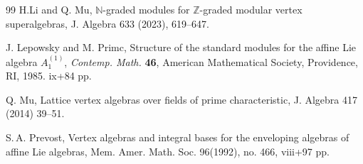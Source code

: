 \documentclass[12pt]{article}
\def\ZZ{{\mathbb Z}}
\begin{document}
\begin{thebibliography}{99}
 H.Li and Q. Mu, $\mathbb{N}$-graded modules for $\ZZ$-graded modular vertex
superalgebras, J. Algebra 633 (2023), 619--647.

J. Lepowsky and M. Primc, Structure of the standard modules for the affine Lie algebra $A^{(1)}_1$,  \emph{Contemp. Math.}  \textbf{46}, 
American Mathematical Society, Providence, RI, 1985. ix+84 pp.


 Q. Mu, Lattice vertex algebras over fields of prime characteristic, J. Algebra 417 (2014) 39--51.

 S.\,A. Prevost, Vertex algebras and integral bases for the enveloping algebras of affine Lie algebras, {Mem. Amer. Math. Soc.} 96(1992), no. 466, viii+97 pp.


\end{thebibliography}
\end{document}
